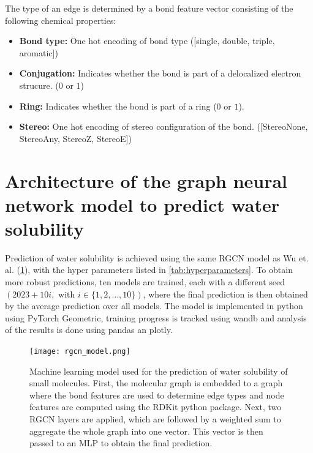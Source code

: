 The type of an edge is determined by a bond feature vector consisting of the following chemical properties:


\begin{itemize}
    \item \textbf{Bond type:} One hot encoding of bond type ([single, double, triple, aromatic])
    \item \textbf{Conjugation:} Indicates whether the bond is part of a delocalized electron strucure.
        ($0$ or $1$) 
    \item \textbf{Ring:} Indicates whether the bond is part of a ring ($0$ or $1$).
    \item \textbf{Stereo:} One hot encoding of stereo configuration of the bond.
        ([StereoNone, StereoAny, StereoZ, StereoE])
\end{itemize}


\section{Architecture of the graph neural network model to predict water solubility}


Prediction of water solubility is achieved using the same RGCN model as Wu et. al. (\cref{fig:ml_model}),
with the hyper parameters listed in \cref{tab:hyperparameters}. To obtain more 
robust predictions, ten models are trained, each with a different seed 
$(2023 + 10i, \text{ with } i \in \{1, 2, \dots, 10\})$, where the final 
prediction is then obtained by the average prediction over all models.\cite{wu2023chemistry} 
The model is implemented in python using PyTorch Geometric\cite{Fey/Lenssen/2019}, training progress 
is tracked using wandb\cite{wandb} and analysis of the results is done using 
pandas\cite{reback2020pandas} an plotly\cite{plotly}.


\begin{figure}[h]
    \centering
    \texttt{[image: rgcn\_model.png]}
    \caption{Machine learning model used for the prediction of water solubility of 
        small molecules. First, the molecular graph is embedded to a graph where the 
        bond features are used to determine edge types and node features are computed 
        using the RDKit python package. Next, two RGCN layers are applied, which are 
        followed by a weighted sum to aggregate the whole graph into one vector. This 
        vector is then passed to an MLP to obtain the final prediction.
    }
    \label{fig:ml_model}
\end{figure}


